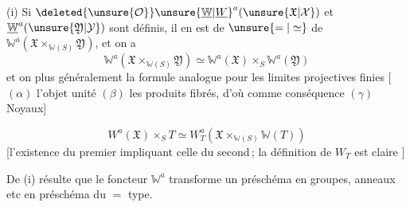 (i) Si $\deleted{\unsure{\mathcal O}}\unsure{\underline{\mathbb W}|\underline W}^a(\unsure{\mathfrak X|\mathcal X})$ et $\underline{\mathbb W}^a(\unsure{\mathfrak Y|\mathcal Y})$ sont définis, il en est de $\unsure{=|\simeq}$ de $\mathbb W^a(\mathfrak X\times_{\mathbb W(S)}\mathfrak Y)$, et on a
\[
 \mathbb W^a(\mathfrak X\times_{\mathbb W(S)}\mathfrak Y)\simeq \mathbb W^a(\mathfrak X)\times_S \mathbb W^a(\mathfrak Y)
\]
et on  plus généralement  la formule analogue pour les limites projectives finies [ $(\alpha)$ l'objet unité $(\beta)$ les produits fibrés, d'où comme conséquence $(\gamma)$ Noyaux]

\[
 W^a(\mathfrak X)\times_S T\simeq W_T^a(\mathfrak X\times_{\mathbb W(S)}\mathbb W(T))\tag*{(ii)}
\]
[l'existence du premier  impliquant celle du second\,; la définition de $W_T$ est claire \unsure{\dots}]

De (i) résulte que le foncteur $\mathbb W^a$ transforme un préschéma en groupes, anneaux etc en préschéma du $=$ type.
